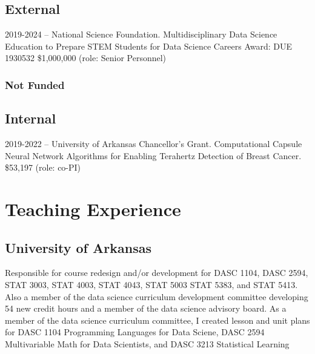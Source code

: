 \documentclass[11pt,]{article}
\providecommand{\tightlist}{%
  \setlength{\itemsep}{0pt}\setlength{\parskip}{0pt}}
\renewenvironment{itemize}{
  \begin{list}{}{
    \setlength{\leftmargin}{1.5em}
  }
}{
  \end{list}
}
\begin{document}
\hypertarget{external}{%
\subsection{External}\label{external}}

\begin{itemize}
\tightlist
\item
  2019-2024 -- National Science Foundation. Multidisciplinary Data
  Science Education to Prepare STEM Students for Data Science Careers
  Award: DUE 1930532 \$1,000,000 (role: Senior Personnel)
\end{itemize}

\hypertarget{not-funded}{%
\subsubsection{Not Funded}\label{not-funded}}

\hypertarget{internal}{%
\subsection{Internal}\label{internal}}

\begin{itemize}
\tightlist
\item
  2019-2022 -- University of Arkansas Chancellor's Grant. Computational
  Capsule Neural Network Algorithms for Enabling Terahertz Detection of
  Breast Cancer. \$53,197 (role: co-PI)
\end{itemize}

\hypertarget{teaching-experience}{%
\section{Teaching Experience}\label{teaching-experience}}

\hypertarget{university-of-arkansas}{%
\subsection{University of Arkansas}\label{university-of-arkansas}}

Responsible for course redesign and/or development for DASC 1104, DASC
2594, STAT 3003, STAT 4003, STAT 4043, STAT 5003 STAT 5383, and STAT
5413. Also a member of the data science curriculum development committee
developing 54 new credit hours and a member of the data science advisory
board. As a member of the data science curriculum committee, I created
lesson and unit plans for DASC 1104 Programming Languages for Data
Sciene, DASC 2594 Multivariable Math for Data Scientists, and DASC 3213
Statistical Learning
\end{document}
